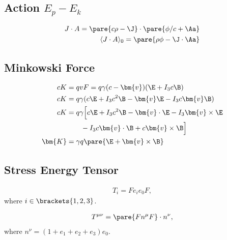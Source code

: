 \subsection{Action $E_p - E_k$}

  \begin{align}
    J \cdot A = \pare{c\rho - \J}\cdot \pare{\phi/c + \Aa}\\
    \langle J \cdot A \rangle_0 = \pare{\rho\phi - \J\cdot\Aa}
  \end{align}

\subsection{Minkowski Force}

  \begin{align}
    cK &= q v F = q \gamma (c - \bm{v}) (\E + I_3c\B) \\
    cK &= q \gamma ( c\E + I_3 c^2\B - \bm{v}\E - I_3c\bm{v}\B )\\
    cK &= q\gamma \Big[ c\E + I_3c^2\B - \bm{v}\cdot \E - I_3\bm{v}\times\E \nonumber \\
    &\qquad - I_3c\bm{v}\cdot \B + c\bm{v}\times \B\Big]\\
    \bm{K} &= \gamma q \pare{ \E + \bm{v}\times \B}
  \end{align}

\subsection{Stress Energy Tensor}
  \begin{align}
    T_{i} = Fe_ie_0F,
  \end{align}
  where $i \in \brackets{1,2,3}$.

  \begin{align}
    T^{\mu\nu} = \pare{F n^\mu F}\cdot n^\nu,
  \end{align}
  where $n^\nu = (1 + e_1 + e_2 + e_3)e_0$.


